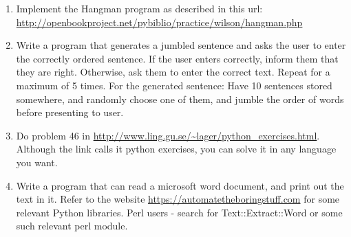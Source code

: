 \documentclass[11pt,a4paper]{article}
\begin{document}
\begin{enumerate}
\item Implement the Hangman program as described in this url: \url{http://openbookproject.net/pybiblio/practice/wilson/hangman.php}
\item Write a program that generates a jumbled sentence and asks the user to enter the correctly ordered sentence. If the user enters correctly, inform them that they are right. Otherwise, ask them to enter the correct text. Repeat for a maximum of 5 times. For the generated sentence: Have 10 sentences stored somewhere, and randomly choose one of them, and jumble the order of words before presenting to user.
\item Do problem 46 in \url{http://www.ling.gu.se/~lager/python_exercises.html}. Although the link calls it python exercises, you can solve it in any language you want.
\item Write a program that can read a microsoft word document, and print out the text in it. Refer to the website \url{https://automatetheboringstuff.com} for some relevant Python libraries. Perl users - search for Text::Extract::Word or some such relevant perl module.
\end{enumerate}
\end{document}
